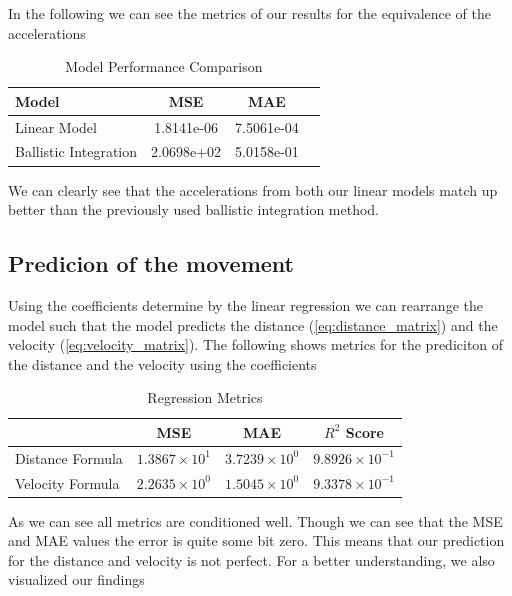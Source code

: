 In the following we can see the metrics of our results for the equivalence of the accelerations

\begin{table}[htbp]
\centering
\caption{Model Performance Comparison}
\label{tab:model_comparison_lin_v_bal}
\begin{tabular}{lccc}
\toprule
Model & MSE & MAE \\
\midrule
Linear Model & 1.8141e-06 & 7.5061e-04 \\
Ballistic Integration & 2.0698e+02 & 5.0158e-01 \\
\bottomrule
\end{tabular}
\end{table}

We can clearly see that the accelerations from both our linear models match up better than the previously used
ballistic integration method.

\subsection{Predicion of the movement}
Using the coefficients determine by the linear regression we can rearrange the model such that the model predicts 
the distance (\ref{eq:distance_matrix}) and the velocity (\ref{eq:velocity_matrix}).
The following shows metrics for the prediciton of the distance and the velocity using the coefficients

\begin{table}[t]
    \centering
    \caption{Regression Metrics}
    \begin{tabular}{lccc}
    \toprule
 & {MSE} & {MAE} & {$R^2$ Score} \\
    \midrule
    Distance Formula & $1.3867 \times 10^{1}$ & $3.7239 \times 10^{0}$ & $9.8926 \times 10^{-1}$ \\
    Velocity Formula & $2.2635 \times 10^{0}$ & $1.5045 \times 10^{0}$ & $9.3378 \times 10^{-1}$ \\
    \bottomrule
    \end{tabular}
    \label{tab:regression_metrics}
\end{table}


As we can see all metrics are conditioned well. 
Though we can see that the MSE and MAE values the error is quite some bit zero.
This means that our prediction for the distance and velocity is not perfect. 
For a better understanding, we also visualized our findings

